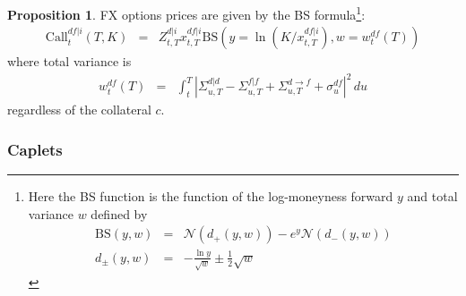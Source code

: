 \documentclass[11pt,english]{amsart}
\newcommand{\BS}{\mathrm{BS}}
\newcommand{\EE}{\mathbb{E}}
\newcommand{\Q}{\Xi}
\theoremstyle{definition}
\newtheorem{prop}{Proposition}
\newtheorem{rema}{Remark}
\begin{document}
\begin{prop}
FX options prices are given by the BS formula\footnote{Here the BS function is the function of the log-moneyness forward $y$ and total variance $w$ defined by 
\begin{eqnarray}
   \BS\left( y , w \right) &=& \mathcal{N}(d_+(y,w)) - e^y \mathcal{N}(d_-(y,w)) \\
   d_{\pm}(y,w) &=& -\frac{\ln y}{\sqrt{w}} \pm \frac{1}{2} \sqrt{w}
\end{eqnarray}}:
\begin{eqnarray}
  \mathrm{Call}^{df|i}_t(T,K)
  &=& Z^{d|i}_{t,T} x^{df|i}_{t,T} \BS\left( y = \ln(K/x^{df|i}_{t,T}), w = w^{df}_{t}(T) \right) 
\end{eqnarray} 
where total variance is 
\begin{eqnarray}
  w^{df}_{t}(T) &=& \int_t^T \left| \Sigma^{d|d}_{u,T} - \Sigma^{f|f}_{u,T}  + \Sigma^{d\to f}_{u,T}  + \sigma^{df}_u \right|^2 \, du 
\end{eqnarray} 
regardless of the collateral $c$.
\end{prop}



\subsubsection{Caplets}
\end{document}
